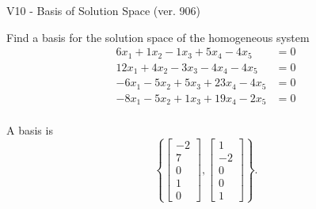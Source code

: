 \begin{exercise}
  \begin{exerciseTitle}V10 - Basis of Solution Space (ver. 906)\end{exerciseTitle}
  \begin{exerciseStatement}
    Find a basis for the solution space of the homogeneous system 
\begin{align*}
 6 x_ 1 + 1 x_ 2 -1 x_ 3 + 5 x_ 4 -4 x_ 5 &= 0  \\ 
  12 x_ 1 + 4 x_ 2 -3 x_ 3 -4 x_ 4 -4 x_ 5 &= 0  \\ 
  -6 x_ 1 -5 x_ 2 + 5 x_ 3 + 23 x_ 4 -4 x_ 5 &= 0  \\ 
  -8 x_ 1 -5 x_ 2 + 1 x_ 3 + 19 x_ 4 -2 x_ 5 &= 0  \\ 
 \end{align*}


 
  \end{exerciseStatement}

  \begin{exerciseAnswer}
   A basis is   
\[\left\{\left[\begin{array}{c}
-2 \\
7 \\
0 \\
1 \\
0
\end{array}\right] , \left[\begin{array}{c}
1 \\
-2 \\
0 \\
0 \\
1
\end{array}\right]\right\}.\]

  


  \end{exerciseAnswer}
\end{exercise}